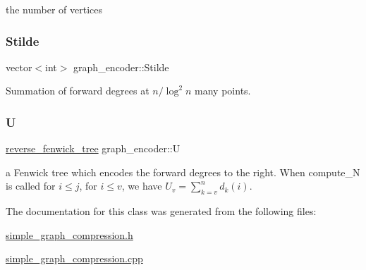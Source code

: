 the number of vertices 

\mbox{\label{classgraph__encoder_a342688a3fdee511b7fae3f155cfb10cf}} 
\subsubsection{\texorpdfstring{Stilde}{Stilde}}
{\footnotesize\ttfamily vector$<$int$>$ graph\+\_\+encoder\+::\+Stilde\hspace{0.3cm}{\ttfamily [private]}}



Summation of forward degrees at $n / \log^2 n$ many points. 

\mbox{\label{classgraph__encoder_a3314c40920f2ee132958a6b0ce7e7995}} 
\subsubsection{\texorpdfstring{U}{U}}
{\footnotesize\ttfamily \hyperlink{classreverse__fenwick__tree}{reverse\+\_\+fenwick\+\_\+tree} graph\+\_\+encoder\+::U\hspace{0.3cm}{\ttfamily [private]}}



a Fenwick tree which encodes the forward degrees to the right. When compute\+\_\+N is called for $i \leq j$, for $i \leq v$, we have $U_v = \sum_{k=v}^n d_k(i)$. 



The documentation for this class was generated from the following files\+:\begin{DoxyCompactItemize}
\item 
\hyperlink{simple__graph__compression_8h}{simple\+\_\+graph\+\_\+compression.\+h}\item 
\hyperlink{simple__graph__compression_8cpp}{simple\+\_\+graph\+\_\+compression.\+cpp}\end{DoxyCompactItemize}
